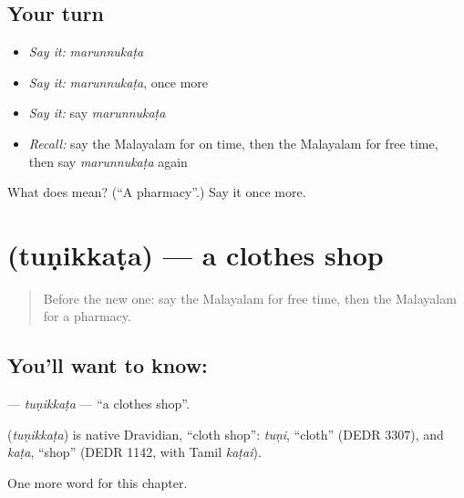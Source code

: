 \subsection*{Your turn}
\begin{itemize}
\raggedright
  \item \emph{Say it:} \emph{marunnukaṭa}
  \item \emph{Say it:} \emph{marunnukaṭa}, once more
  \item \emph{Say it:} say \emph{marunnukaṭa}
  \item \emph{Recall:} say the Malayalam for on time, then the Malayalam for free time, then say \emph{marunnukaṭa} again
\end{itemize}

\begin{tcolorbox}[breakable,colback=teal!4,colframe=teal!35!black,title={Before you move on}]
What does  mean? (\textquotedblleft{}A pharmacy\textquotedblright{}.) Say it once more.
\end{tcolorbox}
\section[\texorpdfstring{\ml{തുണിക്കട} (tuṇikkaṭa)}{തുണിക്കട (tuṇikkaṭa)}]{ (tuṇikkaṭa) — a clothes shop}

\label{lesson:ML-C197-tunikkata}



\begin{quote}
Before the new one: say the Malayalam for free time, then the Malayalam for a pharmacy.
\end{quote}

\subsection*{You'll want to know: }
\textbf{} — \emph{tuṇikkaṭa} — \textquotedblleft{}a clothes shop\textquotedblright{}.

\begin{cousinweb}
\textbf{} (\emph{tuṇikkaṭa}) is native Dravidian, \textquotedblleft{}cloth shop\textquotedblright{}: \emph{tuṇi}, \textquotedblleft{}cloth\textquotedblright{} (DEDR 3307), and \emph{kaṭa}, \textquotedblleft{}shop\textquotedblright{} (DEDR 1142, with Tamil \emph{kaṭai}).
\end{cousinweb}

\begin{grammarlens}[title={What you've built}]
One more word for this chapter.
\end{grammarlens}

